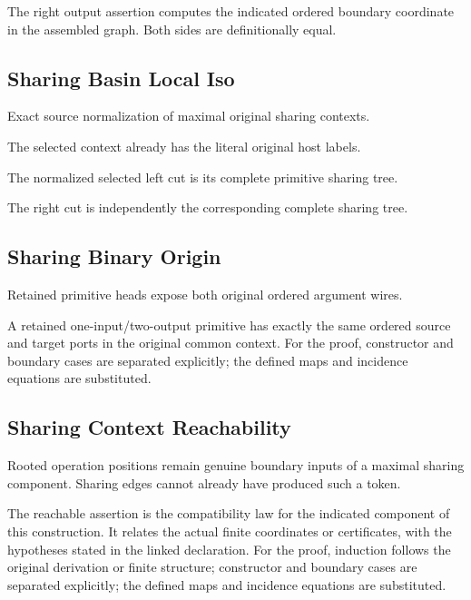 The right output assertion computes the indicated ordered boundary coordinate in the assembled graph.
Both sides are definitionally equal.
\par{}

\subsection{Sharing Basin Local Iso}
Exact source normalization of maximal original sharing contexts.

The selected context already has the literal original host labels.
\par{}

The normalized selected left cut is its complete primitive sharing tree.
\par{}

The right cut is independently the corresponding complete sharing tree.
\par{}

\subsection{Sharing Binary Origin}
Retained primitive heads expose both original ordered argument wires.

A retained one-input/two-output primitive has exactly the same ordered source and target ports in the original common context.
For the proof, constructor and boundary cases are separated explicitly; the defined maps and incidence equations are substituted.
\par{}

\subsection{Sharing Context Reachability}
Rooted operation positions remain genuine boundary inputs of a maximal sharing component. Sharing edges cannot already have produced such a token.

The reachable assertion is the compatibility law for the indicated component of this construction. It relates the actual finite coordinates or certificates, with the hypotheses stated in the linked declaration.
For the proof, induction follows the original derivation or finite structure; constructor and boundary cases are separated explicitly; the defined maps and incidence equations are substituted.
\par{}

